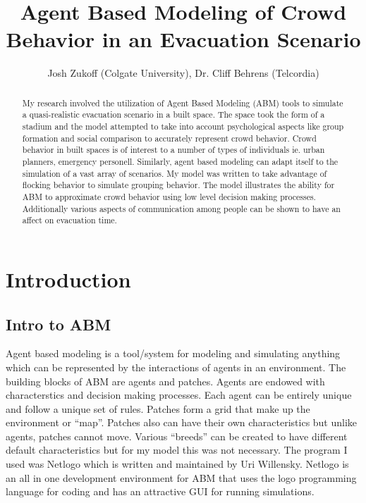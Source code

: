\documentclass{article}
\title{Agent Based Modeling of Crowd Behavior in an Evacuation Scenario}
\author{Josh Zukoff (Colgate University), Dr. Cliff Behrens (Telcordia)}
\begin{document}
\fancyheadoffset[LE,RO]{0pt}{\marginparsep + \marginparwidth}
\maketitle

\begin{abstract}
My research involved the utilization of Agent Based Modeling (ABM) tools to
simulate a quasi-realistic evacuation scenario in a built space. The
space took the form of a stadium and the model attempted to take into
account psychological aspects like group formation and social
comparison to accurately represent crowd behavior. Crowd behavior in
built spaces is of interest to a number of types of
individuals ie. urban planners, emergency personell. Similarly, agent based modeling can adapt itself to the
simulation of a vast array of scenarios. My model was written to take
advantage of flocking behavior to simulate grouping behavior. The
model illustrates the ability for ABM to approximate crowd behavior
using low level decision making processes. Additionally various
aspects of communication among people can be shown to have an affect
on evacuation time.

\end{abstract}

\section{Introduction}

\subsection{Intro to ABM}
Agent based modeling is a tool/system for modeling and simulating
anything which can be represented by the interactions of agents in an
environment. The building blocks of ABM are agents and patches. Agents
are endowed with characterstics and decision making processes. Each
agent can be entirely unique and follow a unique set of rules. Patches
form a grid that make up the environment or ``map''. Patches also can
have their own characteristics but unlike agents, patches cannot
move. Various ``breeds'' can be created to have different default
characteristics but for my model this was not necessary. The program I
used was Netlogo which is written and maintained by Uri
Willensky. Netlogo is an all in one development environment for ABM
that uses the logo programming language for coding and has an
attractive GUI for running simulations.
\end{document}
